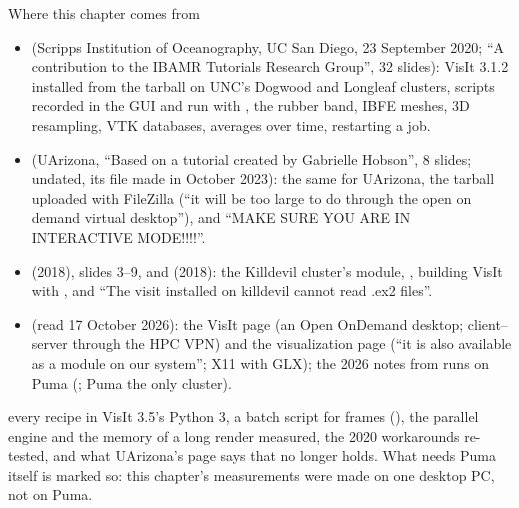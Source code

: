\documentclass[aspectratio=169,11pt]{beamer}
\begin{document}
\begin{frame}{Where this chapter comes from}
\label{fr:sources}
\scriptsize
\begin{itemize}
  \item {} (Scripps Institution of Oceanography, UC San Diego, 23 September 2020; ``A contribution to the IBAMR Tutorials Research Group'', 32 slides): VisIt 3.1.2 installed from the tarball on UNC's Dogwood and Longleaf clusters, scripts recorded in the GUI and run with , the rubber band, IBFE meshes, 3D resampling, VTK databases, averages over time, restarting a job.
  \item {} (UArizona, ``Based on a tutorial created by Gabrielle Hobson'', 8 slides; undated, its file made in October 2023): the same for UArizona, the tarball uploaded with FileZilla (``it will be too large to do through the open on demand virtual desktop''), and ``MAKE SURE YOU ARE IN INTERACTIVE MODE!!!!''.
  \item {} (2018), slides 3--9, and  (2018): the Killdevil cluster's  module, , building VisIt with , and ``The visit installed on killdevil cannot read .ex2 files''.
  \item {} (read 17 October 2026): the VisIt page (an Open OnDemand desktop; client--server through the HPC VPN) and the visualization page (``it is also available as a module on our system''; X11 with GLX); the 2026 notes from runs on Puma (; Puma the only cluster).
\end{itemize}
 every recipe in VisIt 3.5's Python 3, a batch script for frames (), the parallel engine and the memory of a long render measured, the 2020 workarounds re-tested, and what UArizona's page says that no longer holds. What needs Puma itself is marked so: this chapter's measurements were made on one desktop PC, not on Puma.
\end{frame}
\end{document}
